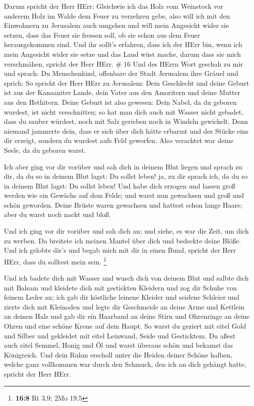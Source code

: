  Darum spricht der Herr HErr: Gleichwie ich das Holz vom
Weinstock vor anderem Holz im Walde dem Feuer zu verzehren gebe, also
will ich mit den Einwohnern zu Jerusalem auch umgehen  und
will mein Angesicht wider sie setzen, dass das Feuer sie fressen soll,
ob sie schon aus dem Feuer herausgekommen sind. Und ihr sollt's
erfahren, dass ich der HErr bin, wenn ich mein Angesicht wider sie setze
 und das Land wüst mache, darum dass sie mich verschmähen,
spricht der Herr HErr. \# 16  Und des HErrn Wort geschah zu
mir und sprach:  Du Menschenkind, offenbare der Stadt
Jerusalem ihre Gräuel und sprich:  So spricht der Herr HErr
zu Jerusalem: Dein Geschlecht und deine Geburt ist aus der Kanaaniter
Lande, dein Vater aus den Amoritern und deine Mutter aus den Hethitern.
 Deine Geburt ist also gewesen: Dein Nabel, da du geboren
wurdest, ist nicht verschnitten; so hat man dich auch mit Wasser nicht
gebadet, dass du sauber würdest, noch mit Salz gerieben noch in Windeln
gewickelt.  Denn niemand jammerte dein, dass er sich über
dich hätte erbarmt und der Stücke eins dir erzeigt, sondern du wurdest
aufs Feld geworfen. Also verachtet war deine Seele, da du geboren warst.

 Ich aber ging vor dir vorüber und sah dich in deinem Blut
liegen und sprach zu dir, da du so in deinem Blut lagst: Du sollst
leben! ja, zu dir sprach ich, da du so in deinem Blut lagst: Du sollst
leben!  Und habe dich erzogen und lassen groß werden wie ein
Gewächs auf dem Felde; und warst nun gewachsen und groß und schön
geworden. Deine Brüste waren gewachsen und hattest schon lange Haare;
aber du warst noch nackt und bloß.

 Und ich ging vor dir vorüber und sah dich an; und siehe, es
war die Zeit, um dich zu werben. Da breitete ich meinen Mantel über dich
und bedeckte deine Blöße. Und ich gelobte dir's und begab mich mit dir
in einen Bund, spricht der Herr HErr, dass du solltest mein sein.
\footnote{\textbf{16:8} Rt 3,9; 2Mo 19,5}

 Und ich badete dich mit Wasser und wusch dich von deinem
Blut und salbte dich mit Balsam  und kleidete dich mit
gestickten Kleidern und zog dir Schuhe von feinem Leder an; ich gab dir
köstliche leinene Kleider und seidene Schleier  und zierte
dich mit Kleinoden und legte dir Geschmeide an deine Arme und Kettlein
an deinen Hals  und gab dir ein Haarband an deine Stirn und
Ohrenringe an deine Ohren und eine schöne Krone auf dein Haupt.
 So warst du geziert mit eitel Gold und Silber und
gekleidet mit eitel Leinwand, Seide und Gesticktem. Du aßest auch eitel
Semmel, Honig und Öl und warst überaus schön und bekamst das Königreich.
 Und dein Ruhm erscholl unter die Heiden deiner Schöne
halben, welche ganz vollkommen war durch den Schmuck, den ich an dich
gehängt hatte, spricht der Herr HErr.

